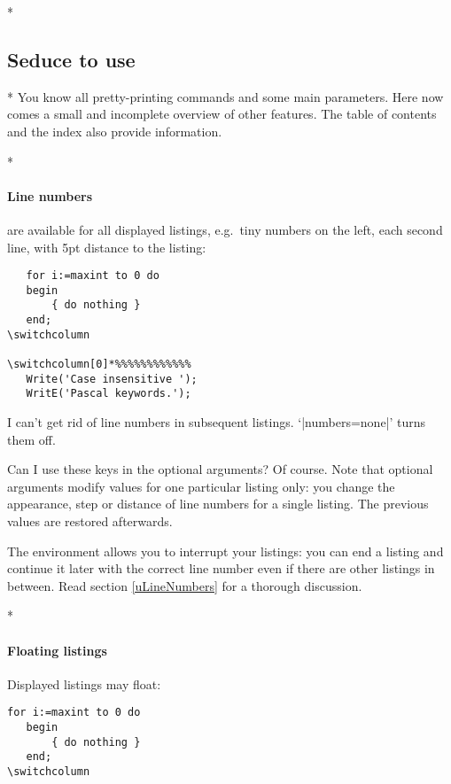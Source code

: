 \begin{paracol}{2}
\begin{paracol}{2}
{\switchcolumn[0]*%
\subsection{Seduce to use}\label{gSeduceToUse}
\switchcolumn

\switchcolumn[0]*%
You know all pretty-printing commands and some main parameters. Here now
comes a small and incomplete overview of other features. The table of
contents and the index also provide information.
\switchcolumn

\switchcolumn[0]*%
\paragraph{Line numbers}
are available for all displayed listings, e.g.~tiny numbers on the left, each
second line, with 5pt distance to the listing:
\begin{lstxsample}
   \lstset{numbers=left, numberstyle=\tiny, stepnumber=2, numbersep=5pt}
\end{lstxsample}
\begin{lstsample}{}{}
   \begin{lstlisting}
   for i:=maxint to 0 do
   begin
       { do nothing }
   end;
\switchcolumn

\switchcolumn[0]*%%%%%%%%%%%%
   Write('Case insensitive ');
   WritE('Pascal keywords.');
   \end{lstlisting}
\end{lstsample}
\begin{advise}
\item I can't get rid of line numbers in subsequent listings.
      \advisespace
      `|numbers=none|' turns them off.
\item Can I use these keys in the optional arguments?
      \advisespace
      Of course. Note that optional arguments modify values for one
      particular listing only: you change the appearance, step or distance
      of line numbers for a single listing. The previous values are
      restored afterwards.
\end{advise}
The environment allows you to interrupt your listings: you can end a listing
and continue it later with the correct line number even if there are other
listings in between. Read section \ref{uLineNumbers} for a thorough
discussion.
\switchcolumn

\switchcolumn[0]*%
\paragraph{Floating listings}
Displayed listings may float:
\begin{lstsample}{\lstset{frame=tb}}{}
   \begin{lstlisting}[float,caption=A floating example]
   for i:=maxint to 0 do
   begin
       { do nothing }
   end;
\switchcolumn


\end{lstlisting}
\end{lstsample}}
\end{paracol}
\end{paracol}
